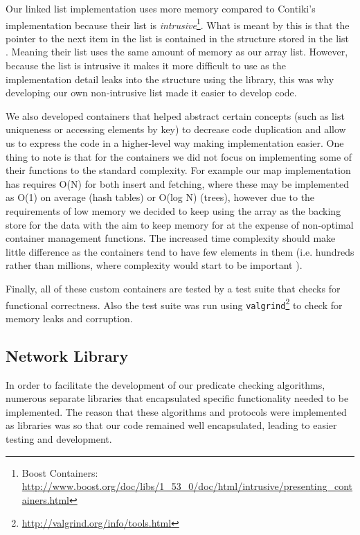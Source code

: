 Our linked list implementation uses more memory compared to Contiki's implementation because their list is \emph{intrusive}\footnote{Boost Containers: \url{http://www.boost.org/doc/libs/1\_53\_0/doc/html/intrusive/presenting\_containers.html}}. What is meant by this is that the pointer to the next item in the list is contained in the structure stored in the list \cite{?}. Meaning their list uses the same amount of memory as our array list. However, because the list is intrusive it makes it more difficult to use as the implementation detail leaks into the structure using the library, this was why developing our own non-intrusive list made it easier to develop code.

We also developed containers that helped abstract certain concepts (such as list uniqueness or accessing elements by key) to decrease code duplication and allow us to express the code in a higher-level way making implementation easier. One thing to note is that for the containers we did not focus on implementing some of their functions to the standard complexity. For example our map implementation has requires O(N) for both insert and fetching, where these may be implemented as O(1) on average (hash tables) or O(log N) (trees), however due to the requirements of low memory we decided to keep using the array as the backing store for the data with the aim to keep memory for at the expense of non-optimal container management functions. The increased time complexity should make little difference as the containers tend to have few elements in them (i.e. hundreds rather than millions, where complexity would start to be important \cite{?}).

Finally, all of these custom containers are tested by a test suite that checks for functional correctness. Also the test suite was run using \verb|valgrind|\footnote{\url{http://valgrind.org/info/tools.html}} to check for memory leaks and corruption.

\subsection{Network Library}

In order to facilitate the development of our predicate checking algorithms, numerous separate libraries that encapsulated specific functionality needed to be implemented. The reason that these algorithms and protocols were implemented as libraries was so that our code remained well encapsulated, leading to easier testing and development.

